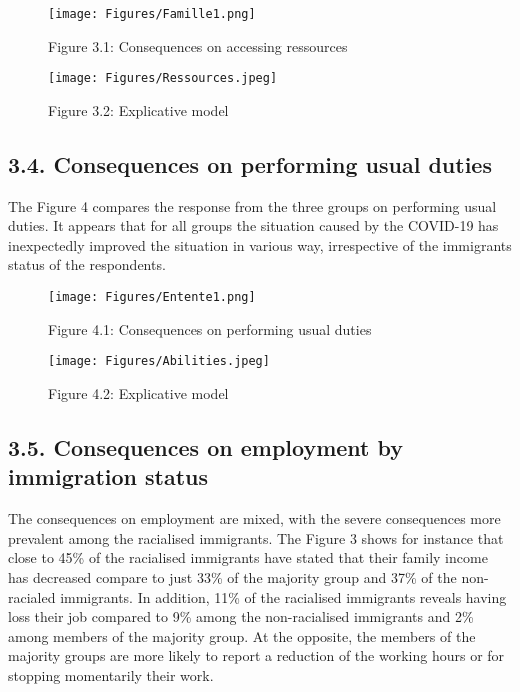 \documentclass[
]{article}
\begin{document}
\begin{figure}
\centering
\texttt{[image: Figures/Famille1.png]}
\caption{Figure 3.1: Consequences on accessing
ressources}
\end{figure}

\begin{figure}
\centering
\texttt{[image: Figures/Ressources.jpeg]}
\caption{Figure 3.2: Explicative model}
\end{figure}

\hypertarget{consequences-on-performing-usual-duties-1}{%
\subsection{3.4. Consequences on performing usual duties}\label{consequences-on-performing-usual-duties-1}}

The Figure 4 compares the response from the three groups on performing usual
duties. It appears that for all groups the situation caused by the COVID-19 has
inexpectedly improved the situation in various way, irrespective of the
immigrants status of the respondents.

\begin{figure}
\centering
\texttt{[image: Figures/Entente1.png]}
\caption{Figure 4.1: Consequences on performing usual duties}
\end{figure}

\begin{figure}
\centering
\texttt{[image: Figures/Abilities.jpeg]}
\caption{Figure 4.2: Explicative model}
\end{figure}

\hypertarget{consequences-on-employment-by-immigration-status-1}{%
\subsection{3.5. Consequences on employment by immigration status}\label{consequences-on-employment-by-immigration-status-1}}

The consequences on employment are mixed, with the severe consequences more
prevalent among the racialised immigrants. The Figure 3 shows for instance that
close to 45\% of the racialised immigrants have stated that their family income
has decreased compare to just 33\% of the majority group and 37\% of the
non-racialed immigrants. In addition, 11\% of the racialised immigrants reveals
having loss their job compared to 9\% among the non-racialised immigrants and 2\%
among members of the majority group. At the opposite, the members of the
majority groups are more likely to report a reduction of the working hours or
for stopping momentarily their work.
\end{document}
